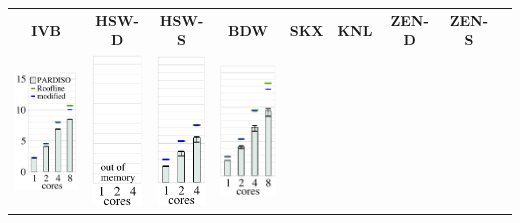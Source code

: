 
 \begin{tabular}{ccccccccl}
 \multicolumn{1}{c}{\scriptsize \bfseries IVB} & \multicolumn{1}{c}{\scriptsize \bfseries
HSW-D} & \multicolumn{1}{c}{\scriptsize \bfseries HSW-S} & \multicolumn{1}{c}{\scriptsize
\bfseries BDW} & \multicolumn{1}{c}{\scriptsize \bfseries SKX} &
\multicolumn{1}{c}{\scriptsize \bfseries KNL} & \multicolumn{1}{c}{\scriptsize \bfseries
    ZEN-D} & \multicolumn{1}{c}{\scriptsize \bfseries ZEN-S} & \\

  \includegraphics[height=4.0cm,clip=true]{images/perf/p-80/p-emmy-omen-rgf-tc2_5-lc160}%
  & 
  \includegraphics[height=4.0cm,clip=true]{images/perf/p-80/p-woody-hsw-omen-rgf-tc2_5-lc160}%
  & 
  \includegraphics[height=4.0cm,clip=true]{images/perf/p-80/p-hasep1-omen-rgf-tc2_5-lc160}%
  & 
  \includegraphics[height=4.0cm,clip=true]{images/perf/p-80/p-meggie-omen-rgf-tc2_5-lc160}%

\end{tabular}
